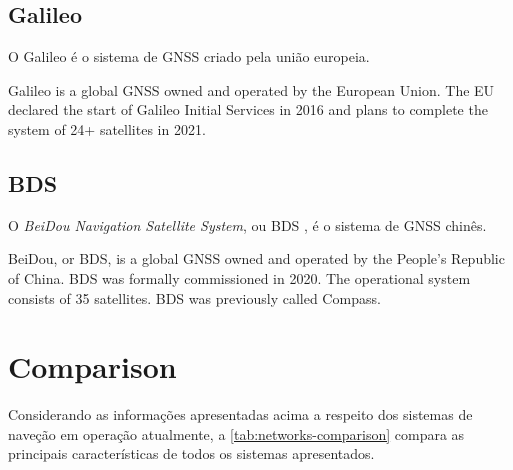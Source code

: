 \subsection{Galileo}

O Galileo é o sistema de GNSS criado pela união europeia.

Galileo is a global GNSS owned and operated by the European Union. The EU declared the start of Galileo Initial Services in 2016 and plans to complete the system of 24+ satellites in 2021.

\subsection{BDS}

O \textit{BeiDou Navigation Satellite System}, ou BDS \cite{beidou}, é o sistema de GNSS chinês.

BeiDou, or BDS, is a global GNSS owned and operated by the People's Republic of China. BDS was formally commissioned in 2020. The operational system consists of 35 satellites. BDS was previously called Compass.


\section{Comparison}

Considerando as informações apresentadas acima a respeito dos sistemas de naveção em operação atualmente, a \autoref{tab:networks-comparison} compara as principais características de todos os sistemas apresentados.


